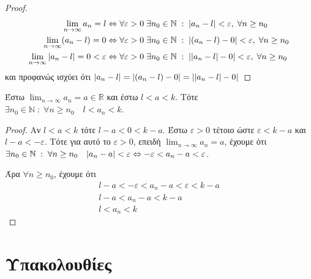 \begin{proof}
\item {}
  \begin{align*} 
    \lim_{n \to \infty} a_{n}= l & \Leftrightarrow \forall 
    \varepsilon > 0 \; \exists n_{0} \in \mathbb{N} \; : \; 
    \abs{a_{n}-l} < \varepsilon, \; \forall n \geq n_{0} \\ 
    \lim_{n \to \infty} (a_{n}-l) = 0 & \Leftrightarrow \forall 
    \varepsilon >0 \; \exists n_{0} \in \mathbb{N} \; : \; 
    \abs {(a_{n}-l) - 0} < \varepsilon , \; \forall n \geq n_{0} \\
    \lim_{n \to \infty} \abs{a_{n}-l}=0 < \varepsilon & \Leftrightarrow 
    \forall \varepsilon > 0 \; \exists n_{0} \in \mathbb{N} 
    \; : \; \abs {\abs{a_{n}- l } - 0} < \varepsilon, \; \forall n \geq 
    n_{0} 
  \end{align*}
  και προφανώς ισχύει ότι 
  $ \abs{a_{n}-l} = \abs{(a_{n}-l)-0} = \abs{\abs{a_{n}- l} -0} $
\end{proof}

\begin{mybox3}
  \begin{prop}
    Έστω $ \lim_{n \to \infty} a_{n}=a \in \mathbb{R} $ και έστω $ l<a<k $. Τότε 
    $ \exists n_{0} \in \mathbb{N} \; : \; \forall n \geq n_{0} \quad l < a_{n} < k $.
  \end{prop}
\end{mybox3}
\begin{proof}
  Αν $ l<a<k $ τότε $l-a<0<k-a $.
  Έστω $ \varepsilon >0 $ τέτοιο ώστε $ \varepsilon < k-a $ και $ l-a < - 
  \varepsilon $. Τότε για αυτό το $ \varepsilon >0 $, επειδή $ \lim_{n \to \infty}
  a_{n}=a $, έχουμε ότι $ \exists n_{0} \in \mathbb{N} \; : \; \forall n \geq n_{0}
  \quad \abs{a_{n}- a} < \varepsilon \Leftrightarrow - \varepsilon < a_{n}-a <
  \varepsilon $. 

  Άρα $ \forall n \geq n_{0} $, έχουμε ότι
  \begin{gather*}
    l-a < -\varepsilon < a_{n}-a < \varepsilon < k-a \\
    l-a < a_{n}- a< k-a \\
    l < a_{n} < k
  \end{gather*} 
\end{proof}


\section{Υπακολουθίες}

